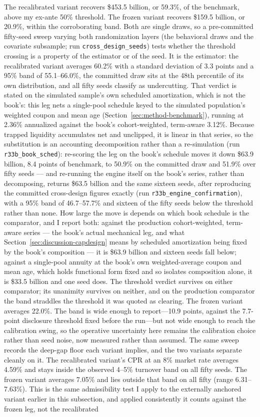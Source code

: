 \documentclass[12pt]{article}
\begin{document}
The recalibrated variant recovers \$453.5 billion, or 59.3\%, of the benchmark, above my ex-ante 50\% threshold. The frozen variant recovers \$159.5 billion, or 20.9\%, within the corroborating band. Both are single draws, so a pre-committed fifty-seed sweep varying both randomization layers (the behavioral draws and the covariate subsample; run \texttt{cross\_design\_seeds}) tests whether the threshold crossing is a property of the estimator or of the seed. It is the estimator: the recalibrated variant averages 60.2\% with a standard deviation of 3.3 points and a 95\% band of 55.1--66.0\%, the committed draw sits at the 48th percentile of its own distribution, and all fifty seeds classify as undercutting. That verdict is stated on the simulated sample's own scheduled amortization, which is not the book's: this leg nets a single-pool schedule keyed to the simulated population's weighted coupon and mean age (Section~\ref{sec:method-benchmark}), running at 2.36\% annualized against the book's cohort-weighted, term-aware 3.12\%. Because trapped liquidity accumulates net and unclipped, it is linear in that series, so the substitution is an accounting decomposition rather than a re-simulation (run \texttt{r33b\_book\_sched}): re-scoring the leg on the book's schedule moves it down \$63.9 billion, 8.4 points of benchmark, to 50.9\% on the committed draw and 51.9\% over fifty seeds --- and re-running the engine itself on the book's series, rather than decomposing, returns \$63.5 billion and the same sixteen seeds, after reproducing the committed cross-design figures exactly (run \texttt{r33b\_engine\_confirmation}), with a 95\% band of 46.7--57.7\% and sixteen of the fifty seeds below the threshold rather than none. How large the move is depends on which book schedule is the comparator, and I report both: against the production cohort-weighted, term-aware series --- the book's actual mechanical leg, and what Section~\ref{sec:discussion-capdesign} means by scheduled amortization being fixed by the book's composition --- it is \$63.9 billion and sixteen seeds fall below; against a single-pool annuity at the book's own weighted-average coupon and mean age, which holds functional form fixed and so isolates composition alone, it is \$33.5 billion and one seed does. The threshold verdict survives on either comparator; its unanimity survives on neither, and on the production comparator the band straddles the threshold it was quoted as clearing. The frozen variant averages 22.0\%. The band is wide enough to report---10.9 points, against the 7.7-point disclosure threshold fixed before the run---but not wide enough to reach the calibration swing, so the operative uncertainty here remains the calibration choice rather than seed noise, now measured rather than assumed. The same sweep records the deep-gap floor each variant implies, and the two variants separate cleanly on it. The recalibrated variant's CPR at an 8\% market rate averages 4.59\% and stays inside the observed 4--5\% turnover band on all fifty seeds. The frozen variant averages 7.05\% and lies outside that band on all fifty (range 6.31--7.63\%). This is the same admissibility test I apply to the externally anchored variant earlier in this subsection, and applied consistently it counts against the frozen leg, not the recalibrated 
\end{document}
